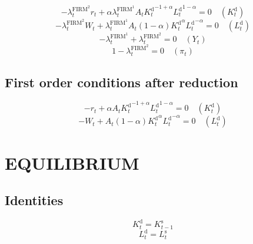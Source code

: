 \begin{equation}
-{\lambda^{\mathrm{FIRM}^{\mathrm{2}}}_{t}} {r_{t}} + {\alpha} {\lambda^{\mathrm{FIRM}^{\mathrm{1}}}_{t}} {A_{t}} {{K^{\mathrm{d}}_{t}}^{-1 + \alpha}} {{L^{\mathrm{d}}_{t}}^{1 - \alpha}} = 0
 \quad \left(K^{\mathrm{d}}_{t}\right)
\end{equation}
\begin{equation}
-{\lambda^{\mathrm{FIRM}^{\mathrm{2}}}_{t}} {W_{t}} + {\lambda^{\mathrm{FIRM}^{\mathrm{1}}}_{t}} {A_{t}} \left(1 - \alpha\right) {{K^{\mathrm{d}}_{t}}^{\alpha}} {{L^{\mathrm{d}}_{t}}^{-\alpha}} = 0
 \quad \left(L^{\mathrm{d}}_{t}\right)
\end{equation}
\begin{equation}
-\lambda^{\mathrm{FIRM}^{\mathrm{1}}}_{t} + \lambda^{\mathrm{FIRM}^{\mathrm{2}}}_{t} = 0
 \quad \left(Y_{t}\right)
\end{equation}
\begin{equation}
1 - \lambda^{\mathrm{FIRM}^{\mathrm{2}}}_{t} = 0
 \quad \left(\pi_{t}\right)
\end{equation}


\subsection{First order conditions after reduction}

\begin{equation}
-r_{t} + {\alpha} {A_{t}} {{K^{\mathrm{d}}_{t}}^{-1 + \alpha}} {{L^{\mathrm{d}}_{t}}^{1 - \alpha}} = 0
 \quad \left(K^{\mathrm{d}}_{t}\right)
\end{equation}
\begin{equation}
-W_{t} + {A_{t}} \left(1 - \alpha\right) {{K^{\mathrm{d}}_{t}}^{\alpha}} {{L^{\mathrm{d}}_{t}}^{-\alpha}} = 0
 \quad \left(L^{\mathrm{d}}_{t}\right)
\end{equation}




\section{EQUILIBRIUM}

\subsection{Identities}

\begin{equation}
K^{\mathrm{d}}_{t} = K^{\mathrm{s}}_{t-1}
\end{equation}
\begin{equation}
L^{\mathrm{d}}_{t} = L^{\mathrm{s}}_{t}
\end{equation}




